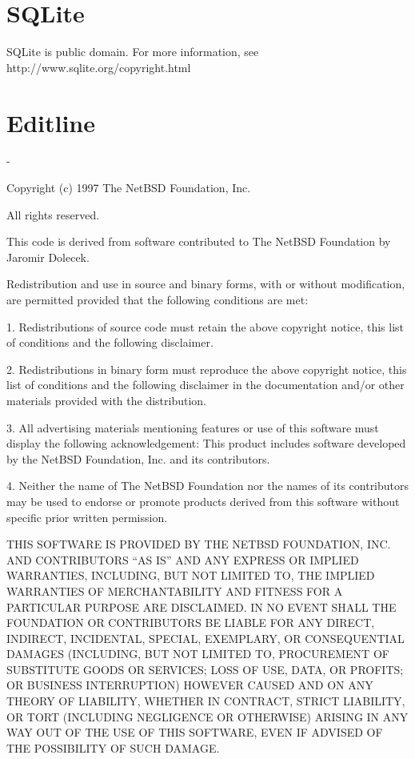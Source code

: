 \documentclass[twoside]{tceusermanual}
\begin{document}
\section{SQLite}

SQLite is public domain. For more information, see http://www.sqlite.org/copyright.html

\section{Editline}

   -

   Copyright (c) 1997 The NetBSD Foundation, Inc.

   All rights reserved.
  
   This code is derived from software contributed to The NetBSD Foundation
   by Jaromir Dolecek.
  
   Redistribution and use in source and binary forms, with or without
   modification, are permitted provided that the following conditions
   are met:

   1. Redistributions of source code must retain the above copyright
      notice, this list of conditions and the following disclaimer.

   2. Redistributions in binary form must reproduce the above copyright
      notice, this list of conditions and the following disclaimer in the
      documentation and/or other materials provided with the distribution.

   3. All advertising materials mentioning features or use of this software
      must display the following acknowledgement:
        This product includes software developed by the NetBSD
        Foundation, Inc. and its contributors.

   4. Neither the name of The NetBSD Foundation nor the names of its
      contributors may be used to endorse or promote products derived
      from this software without specific prior written permission.
  
   THIS SOFTWARE IS PROVIDED BY THE NETBSD FOUNDATION, INC. AND CONTRIBUTORS
   ``AS IS'' AND ANY EXPRESS OR IMPLIED WARRANTIES, INCLUDING, BUT NOT LIMITED
   TO, THE IMPLIED WARRANTIES OF MERCHANTABILITY AND FITNESS FOR A PARTICULAR
   PURPOSE ARE DISCLAIMED.  IN NO EVENT SHALL THE FOUNDATION OR CONTRIBUTORS
   BE LIABLE FOR ANY DIRECT, INDIRECT, INCIDENTAL, SPECIAL, EXEMPLARY, OR
   CONSEQUENTIAL DAMAGES (INCLUDING, BUT NOT LIMITED TO, PROCUREMENT OF
   SUBSTITUTE GOODS OR SERVICES; LOSS OF USE, DATA, OR PROFITS; OR BUSINESS
   INTERRUPTION) HOWEVER CAUSED AND ON ANY THEORY OF LIABILITY, WHETHER IN
   CONTRACT, STRICT LIABILITY, OR TORT (INCLUDING NEGLIGENCE OR OTHERWISE)
   ARISING IN ANY WAY OUT OF THE USE OF THIS SOFTWARE, EVEN IF ADVISED OF THE
   POSSIBILITY OF SUCH DAMAGE.


\cleardoublepage

\end{document}
